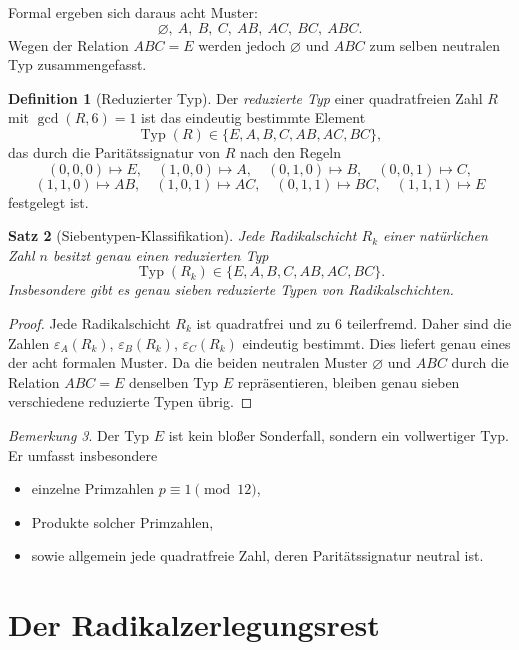 \documentclass[11pt,a4paper]{article}
\newtheorem{satz}{Satz}
\theoremstyle{definition}
\newtheorem{definition}[satz]{Definition}
\theoremstyle{remark}
\newtheorem{bemerkung}[satz]{Bemerkung}
\newcommand{\Typ}{\operatorname{Typ}}
\begin{document}
	Formal ergeben sich daraus acht Muster:
	\[
	\varnothing,\ A,\ B,\ C,\ AB,\ AC,\ BC,\ ABC.
	\]
	Wegen der Relation \(ABC=E\) werden jedoch \(\varnothing\) und \(ABC\) zum selben neutralen Typ
	zusammengefasst.
	
	\begin{definition}[Reduzierter Typ]
		Der \emph{reduzierte Typ} einer quadratfreien Zahl \(R\) mit \(\gcd(R,6)=1\) ist das eindeutig
		bestimmte Element
		\[
		\Typ(R)\in\{E,A,B,C,AB,AC,BC\},
		\]
		das durch die Paritätssignatur von \(R\) nach den Regeln
		\[
		(0,0,0)\mapsto E,\quad (1,0,0)\mapsto A,\quad (0,1,0)\mapsto B,\quad (0,0,1)\mapsto C,
		\]
		\[
		(1,1,0)\mapsto AB,\quad (1,0,1)\mapsto AC,\quad (0,1,1)\mapsto BC,\quad (1,1,1)\mapsto E
		\]
		festgelegt ist.
	\end{definition}
	
	\begin{satz}[Siebentypen-Klassifikation]
		Jede Radikalschicht \(R_k\) einer natürlichen Zahl \(n\) besitzt genau einen reduzierten Typ
		\[
		\Typ(R_k)\in\{E,A,B,C,AB,AC,BC\}.
		\]
		Insbesondere gibt es genau sieben reduzierte Typen von Radikalschichten.
	\end{satz}
	
	\begin{proof}
		Jede Radikalschicht \(R_k\) ist quadratfrei und zu \(6\) teilerfremd. Daher sind die Zahlen
		\(\varepsilon_A(R_k)\), \(\varepsilon_B(R_k)\), \(\varepsilon_C(R_k)\) eindeutig bestimmt. Dies
		liefert genau eines der acht formalen Muster. Da die beiden neutralen Muster \(\varnothing\) und
		\(ABC\) durch die Relation \(ABC=E\) denselben Typ \(E\) repräsentieren, bleiben genau sieben
		verschiedene reduzierte Typen übrig.
	\end{proof}
	
	\begin{bemerkung}
		Der Typ \(E\) ist kein bloßer Sonderfall, sondern ein vollwertiger Typ. Er umfasst insbesondere
		\begin{itemize}[itemsep=0.2em]
			\item einzelne Primzahlen \(p\equiv 1\pmod{12}\),
			\item Produkte solcher Primzahlen,
			\item sowie allgemein jede quadratfreie Zahl, deren Paritätssignatur neutral ist.
		\end{itemize}
	\end{bemerkung}
	
	\section{Der Radikalzerlegungsrest}
	
\end{document}

